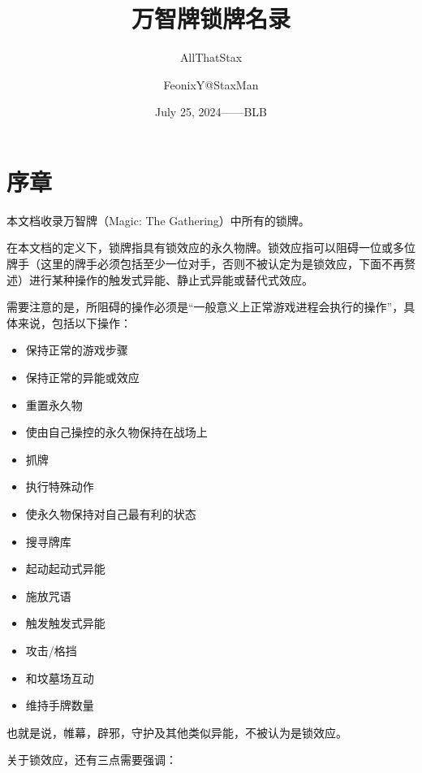 \documentclass[lang = cn, color = black, 10pt]{AllThatStax}
\title{万智牌锁牌名录}
\subtitle{AllThatStax}
\author{FeonixY@StaxMan}
\date{July 25, 2024——BLB}
\begin{document}
\maketitle
\frontmatter

\chapter*{序章}

本文档收录万智牌（Magic: The Gathering）中所有的锁牌。

在本文档的定义下，锁牌指具有锁效应的永久物牌。锁效应指可以阻碍一位或多位牌手（这里的牌手必须包括至少一位对手，否则不被认定为是锁效应，下面不再赘述）进行某种操作的触发式异能、静止式异能或替代式效应。

需要注意的是，所阻碍的操作必须是“一般意义上正常游戏进程会执行的操作”，具体来说，包括以下操作：

\begin{itemize}
	\item 保持正常的游戏步骤
	\item 保持正常的异能或效应
	\item 重置永久物
	\item 使由自己操控的永久物保持在战场上
	\item 抓牌
	\item 执行特殊动作
	\item 使永久物保持对自己最有利的状态
	\item 搜寻牌库
	\item 起动起动式异能
	\item 施放咒语
	\item 触发触发式异能
	\item 攻击/格挡
	\item 和坟墓场互动
	\item 维持手牌数量
\end{itemize}

也就是说，帷幕，辟邪，守护及其他类似异能，不被认为是锁效应。

关于锁效应，还有三点需要强调：
\end{document}
